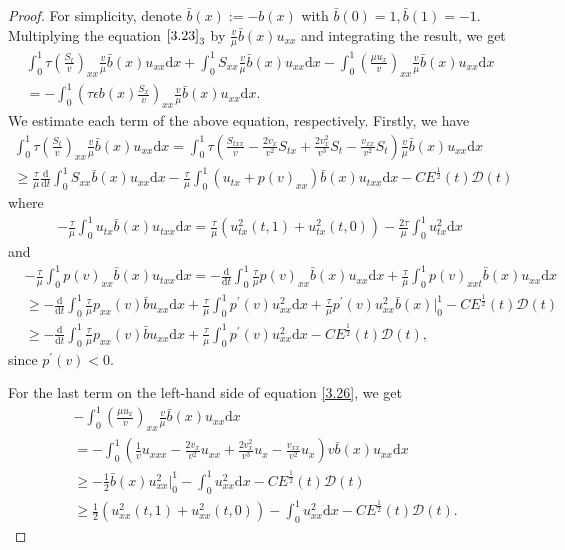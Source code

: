\documentclass[10pt,a4paper]{amsart}
\newcommand{\dif}{\mathrm{d}}
\begin{document}
\begin{proof}
 For simplicity, denote $\bar b(x):=-b(x)$ with $\bar b(0)=1, \bar b (1)=-1$. Multiplying the  equation $\eqref{3.23}_3$ by $\frac{v}{\mu} \bar b(x) u_{xx}$ and integrating the result, we get
\begin{align}
\int_0^1 \tau \left(\frac{S_t}{v}\right)_{xx} \frac{v}{\mu} \bar b(x) u_{xx} \dif x+\int_0^1 S_{xx}\frac{v}{\mu}\bar b(x) u_{xx} \dif x 
-\int_0^1 \left(\frac{\mu u_x}{v}\right)_{xx} \frac{v}{\mu} \bar b(x) u_{xx} \dif x \nonumber\\
=-\int_0^1\left( \tau\epsilon b(x) \frac{S_x}{v}\right)_{xx} \frac{v}{\mu} \bar b(x) u_{xx}\dif x . \label{3.26}
\end{align}
We estimate each term of the above equation, respectively. Firstly, we have
\begin{align*}
\int_0^1 \tau\left(\frac{S_t}{v}\right)_{xx} \frac{v}{\mu} \bar b(x) u_{xx} \dif x
=\int_0^1 \tau \left(\frac{S_{txx}}{v}-\frac{2v_x}{v^2} S_{tx}+\frac{2v_x^2}{v^3} S_t-\frac{v_{xx}}{v^2} S_t\right)\frac{v}{\mu} \bar b(x) u_{xx}\dif x\\
\ge \frac{\tau}{\mu} \frac{\dif}{\dif t}\int_0^1 S_{xx} \bar b(x) u_{xx}\dif x -\frac{\tau}{\mu}\int_0^1 (u_{tx}+p(v)_{xx}) \bar b(x) u_{txx}\dif x -C E^\frac{1}{2}(t) \mathcal D(t)
\end{align*}
where
\begin{align*}
-\frac{\tau}{\mu} \int_0^1 u_{tx} \bar b(x) u_{txx}\dif x=\frac{\tau}{\mu} (u_{tx}^2(t,1)+u_{tx}^2(t, 0)) -\frac{2\tau}{\mu}\int_0^1  u_{tx}^2\dif x 
\end{align*}
and
\begin{align*}
&-\frac{\tau}{\mu} \int_0^1 p(v)_{xx} \bar b(x) u_{txx}\dif x=-\frac{\dif}{\dif t} \int_0^1 \frac{\tau}{\mu}  p(v)_{xx}\bar b(x) u_{xx} \dif x+\frac{\tau}{\mu}\int_0^1 p(v)_{xxt} \bar b(x)u_{xx}\dif x\\
&\ge-\frac{\dif}{\dif t}\int_0^1 \frac{\tau}{\mu} p_{xx}(v) \bar b u_{xx}\dif x +\frac{\tau}{\mu} \int_0^1 p^\prime(v)u_{xx}^2\dif x +\frac{\tau}{\mu} p^\prime(v) u_{xx}^2 \bar b(x)\big|_0^1-CE^\frac{1}{2}(t)\mathcal D(t)\\
 &\ge-\frac{\dif}{\dif t}\int_0^1 \frac{\tau}{\mu} p_{xx}(v) \bar b u_{xx}\dif x +\frac{\tau}{\mu} \int_0^1 p^\prime(v)u_{xx}^2\dif x-CE^\frac{1}{2}(t)\mathcal D(t),
\end{align*} 
since $p^\prime(v)<0$. 

For the last term on the left-hand side of equation \eqref{3.26}, we get
\begin{align*}
&-\int_0^1 \left(\frac{\mu u_x}{v}\right)_{xx} \frac{v}{\mu} \bar b(x) u_{xx}\dif x\\
&=-\int_0^1\left(\frac{1}{v} u_{xxx}-\frac{2v_x}{v^2} u_{xx}+\frac{2v_x^2}{v^3} u_x-\frac{v_{xx}}{v^2}u_x\right)v \bar b(x)u_{xx}\dif x\\
&\ge -\frac{1}{2}\bar b(x) u_{xx}^2 \big|_0^1-\int_0^1 u_{xx}^2\dif x-CE^\frac{1}{2}(t)\mathcal D(t)\\
&\ge \frac{1}{2} (u_{xx}^2(t,1)+u_{xx}^2(t, 0))-\int_0^1 u_{xx}^2 \dif x-CE^\frac{1}{2}(t)\mathcal D(t).
\end{align*}




\end{proof}
\end{document}
